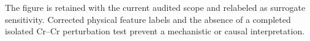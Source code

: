 The figure is retained with the current audited scope and relabeled as surrogate sensitivity. Corrected physical feature labels and the absence of a completed isolated Cr--Cr perturbation test prevent a mechanistic or causal interpretation.

